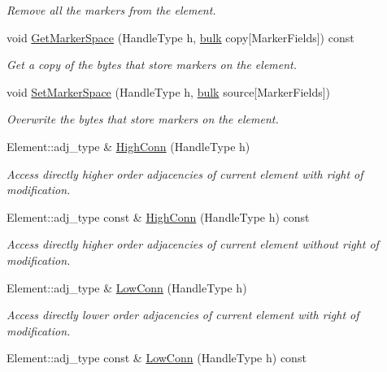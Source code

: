 \begin{DoxyCompactItemize}
\begin{DoxyCompactList}\small\item\em Remove all the markers from the element. \end{DoxyCompactList}\item 
void \hyperlink{classINMOST_1_1Mesh_ab7db80997803b96df82f83c4e53f64ec}{Get\-Marker\-Space} (Handle\-Type h, \hyperlink{classINMOST_1_1Storage_ae429556af77094077d212e0ac23c8cfc}{bulk} copy\mbox{[}Marker\-Fields\mbox{]}) const 
\begin{DoxyCompactList}\small\item\em Get a copy of the bytes that store markers on the element. \end{DoxyCompactList}\item 
void \hyperlink{classINMOST_1_1Mesh_aadcd74b16a7a86db78d2cf5bb814f5a3}{Set\-Marker\-Space} (Handle\-Type h, \hyperlink{classINMOST_1_1Storage_ae429556af77094077d212e0ac23c8cfc}{bulk} source\mbox{[}Marker\-Fields\mbox{]})
\begin{DoxyCompactList}\small\item\em Overwrite the bytes that store markers on the element. \end{DoxyCompactList}\item 
Element\-::adj\-\_\-type \& \hyperlink{classINMOST_1_1Mesh_a1e7462d775868bb6ef687cef8a5198cb}{High\-Conn} (Handle\-Type h)
\begin{DoxyCompactList}\small\item\em Access directly higher order adjacencies of current element with right of modification. \end{DoxyCompactList}\item 
\hypertarget{classINMOST_1_1Mesh_a6728d9a7247c3a1b566fa127785318f7}{Element\-::adj\-\_\-type const \& \hyperlink{classINMOST_1_1Mesh_a6728d9a7247c3a1b566fa127785318f7}{High\-Conn} (Handle\-Type h) const }\label{classINMOST_1_1Mesh_a6728d9a7247c3a1b566fa127785318f7}

\begin{DoxyCompactList}\small\item\em Access directly higher order adjacencies of current element without right of modification. \end{DoxyCompactList}\item 
Element\-::adj\-\_\-type \& \hyperlink{classINMOST_1_1Mesh_ad20f64a301adf9c3fafe28a8f921a791}{Low\-Conn} (Handle\-Type h)
\begin{DoxyCompactList}\small\item\em Access directly lower order adjacencies of current element with right of modification. \end{DoxyCompactList}\item 
\hypertarget{classINMOST_1_1Mesh_ab7f709414cd7ae4464b0e2af48a8e44e}{Element\-::adj\-\_\-type const \& \hyperlink{classINMOST_1_1Mesh_ab7f709414cd7ae4464b0e2af48a8e44e}{Low\-Conn} (Handle\-Type h) const }\label{classINMOST_1_1Mesh_ab7f709414cd7ae4464b0e2af48a8e44e}


\end{DoxyCompactItemize}
